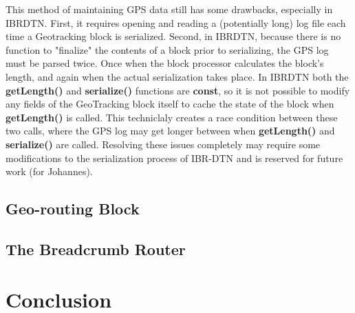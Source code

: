 \documentclass{sig-alternate}
\begin{document}
This method of maintaining GPS data still has some drawbacks, especially in IBRDTN.  First, it requires opening and reading a (potentially long) log file each time a Geotracking block is serialized.  Second, in IBRDTN, because there is no function to "finalize" the contents of a block prior to serializing, the GPS log must be parsed twice.  Once when the block processor calculates the block's length, and again when the actual serialization takes place.  In IBRDTN both the {\bf getLength()} and {\bf serialize()} functions are {\bf const}, so it is not possible to modify any fields of the GeoTracking block itself to cache the state of the block when {\bf getLength()} is called.  This techniclaly creates a race condition between these two calls, where the GPS log may get longer between when {\bf getLength()} and {\bf serialize()} are called.  Resolving these issues completely may require some modifications to the serialization process of IBR-DTN and is reserved for future work (for Johannes).


\subsection{Geo-routing Block}

\subsection{The Breadcrumb Router}


%
%




%
%
\section{Conclusion}




%
%
%
%
%
%
%
%
%
%



\end{document}
